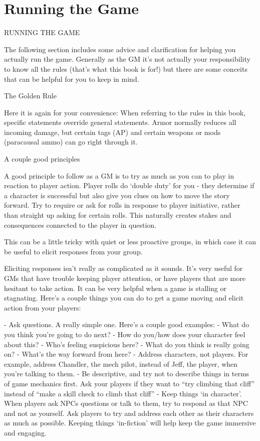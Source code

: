 \section{Running the Game}
RUNNING THE GAME

The following section includes some advice and clarification for helping you actually run the
game. Generally as the GM it’s not actually your responsibility to know all the rules (that’s what
this book is for!) but there are some conceits that can be helpful for you to keep in mind.


                                            The Golden Rule

Here it is again for your convenience: When referring to the rules in this book, specific
statements override general statements. Armor normally reduces all incoming damage, but
certain tags (AP) and certain weapons or mods (paracausal ammo) can go right through it.


                                       A couple good principles

A good principle to follow as a GM is to try as much as you can to play in reaction to player
action. Player rolls do `double duty' for you - they determine if a character is successful but also
give you clues on how to move the story forward. Try to require or ask for rolls in response to
player initiative, rather than straight up asking for certain rolls. This naturally creates stakes and
consequences connected to the player in question.


This can be a little tricky with quiet or less proactive groups, in which case it can be useful to
elicit responses from your group.


Eliciting responses isn’t really as complicated as it sounds. It’s very useful for GMs that have
trouble keeping player attention, or have players that are more hesitant to take action. It can be
very helpful when a game is stalling or stagnating. Here’s a couple things you can do to get a
game moving and elicit action from your players:

            -   Ask questions. A really simple one. Here’s a couple good examples:
                     -   What do you think you’re going to do next?
                     -   How do you/how does your character feel about this?
                     -   Who’s feeling suspicious here?
                     -   What do you think is really going on?
                     -   What’s the way forward from here?
            -   Address characters, not players. For example, address Chandler, the mech
                 pilot, instead of Jeff, the player, when you’re talking to them.
            -    Be descriptive, and try not to describe things in terms of game mechanics first.
                Ask your players if they want to ``try climbing that cliff'' instead of ``make a skill
                check to climb that cliff''
            -    Keep things `in character'. When players ask NPCs questions or talk to them, try
                to respond as that NPC and not as yourself. Ask players to try and address each
                other as their characters as much as possible. Keeping things `in-fiction' will help
                 keep the game immersive and engaging.


